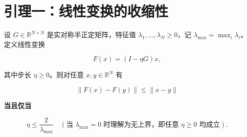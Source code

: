 \section{引理一：线性变换的收缩性}

设 $G \in \mathbb{R}^{N \times N}$ 是实对称半正定矩阵，特征值 $\lambda_1, \dots, \lambda_N \ge 0$，记 $\lambda_{\max} = \max_i \lambda_i$。定义线性变换  

\begin{equation}
F(x) = (I - \eta G)x,
\end{equation}

其中步长 $\eta \ge 0$。则对任意 $x, y \in \mathbb{R}^N$ 有  

\begin{equation}
\|F(x) - F(y)\| \le \|x - y\|
\end{equation}

\textbf{当且仅当}  

\begin{equation}
\eta \le \frac{2}{\lambda_{\max}} \quad (\text{当 } \lambda_{\max}=0 \text{ 时理解为无上界，即任意 } \eta \ge 0 \text{ 均成立}).
\end{equation}

